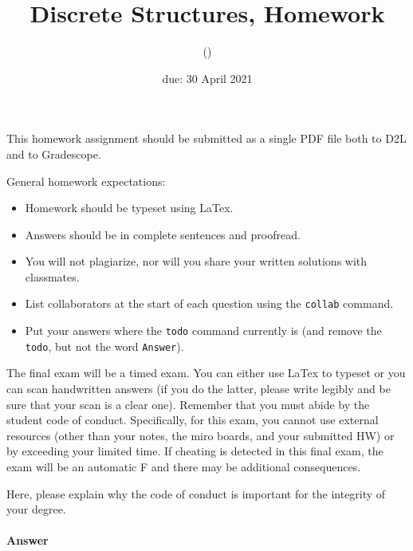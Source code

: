 \documentclass{article}
\title{Discrete Structures, Homework \hwnum}
\author{\todo{Your Name Here} (\todo{your discord handle here})}
\date{due: 30 April 2021}
\begin{document}
\maketitle

This homework assignment should be
submitted as a single PDF file both to D2L and to Gradescope.

General homework expectations:
\begin{itemize}
    \item Homework should be typeset using LaTex.
    \item Answers should be in complete sentences and proofread.
    \item You will not plagiarize, nor will you share your written solutions
        with classmates.
    \item List collaborators at the start of each question using the \texttt{collab} command.
    \item Put your answers where the \texttt{todo} command currently is (and
        remove the \texttt{todo}, but not the word \texttt{Answer}).
\end{itemize}


\collab{\todo{}} 

The final exam will be a timed exam.  You can either use LaTex to typeset or you
can scan handwritten answers (if you do the latter, please write legibly and be
sure that your scan is a clear one).  Remember that you must abide by the
student code of conduct.  Specifically, for this exam, you cannot use external
resources (other than your notes, the miro boards, and your submitted HW) or by
exceeding your limited time.  If cheating is detected in this final exam, the
exam will be an automatic F and there may be additional consequences.

Here, please explain why the code of conduct is important for the integrity of
your degree.

\paragraph{Answer}




\collab{\todo{}} 
\end{document}
